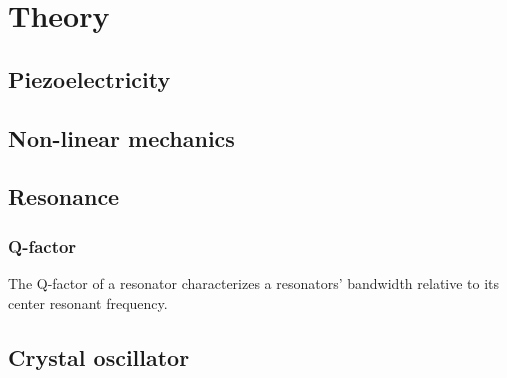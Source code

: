 
\section{Theory}


\subsection{Piezoelectricity}


\subsection{Non-linear mechanics}


\subsection{Resonance}


\subsubsection{Q-factor}
The Q-factor of a resonator characterizes a resonators' bandwidth relative to its center resonant frequency.\cite{electroniccircuits} 


\subsection{Crystal oscillator}
